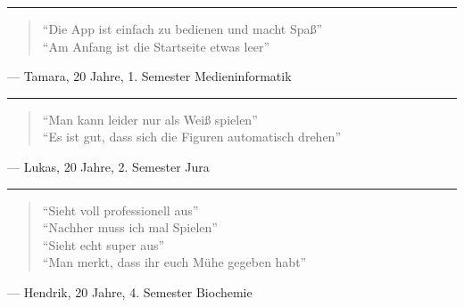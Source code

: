 \hspace{8mm}\rule{.1\textwidth}{0.5pt}
\begin{quote}
``Die App ist einfach zu bedienen und macht Spaß'' \\
``Am Anfang ist die Startseite etwas leer''
\end{quote}
--- Tamara, 20 Jahre, 1. Semester Medieninformatik

\hspace{8mm}\rule{.1\textwidth}{0.5pt}
\begin{quote}
``Man kann leider nur als Weiß spielen'' \\
``Es ist gut, dass sich die Figuren automatisch drehen''
\end{quote}
--- Lukas, 20 Jahre, 2. Semester Jura

\hspace{8mm}\rule{.1\textwidth}{0.5pt}
\begin{quote}
``Sieht voll professionell aus'' \\
``Nachher muss ich mal Spielen'' \\
``Sieht echt super aus'' \\
``Man merkt, dass ihr euch Mühe gegeben habt''
\end{quote}
--- Hendrik, 20 Jahre, 4. Semester Biochemie
